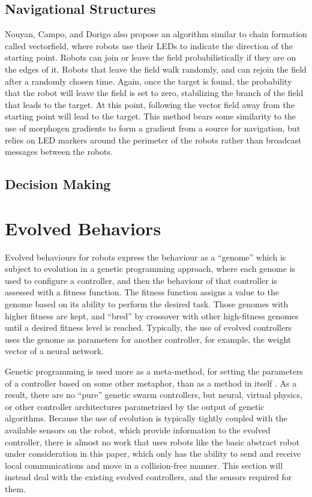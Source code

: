 \documentclass[]{article}
\begin{document}
\subsection{Navigational Structures}

Nouyan, Campo, and Dorigo also propose an algorithm similar to chain formation called vectorfield, where robots use their LEDs to indicate the direction of the starting point.
Robots can join or leave the field probabilistically if they are on the edges of it. 
Robots that leave the field walk randomly, and can rejoin the field after a randomly chosen time.
Again, once the target is found, the probability that the robot will leave the field is set to zero, stabilizing the branch of the field that leads to the target. 
At this point, following the vector field away from the starting point will lead to the target. 
This method bears some similarity to the use of morphogen gradients to form a gradient from a source for navigation, but relies on LED markers around the perimeter of the robots rather than broadcast messages between the robots. 

\subsection{Decision Making}

\section{Evolved Behaviors}

Evolved behaviours for robots express the behaviour as a ``genome'' which is subject to evolution in a genetic programming approach, where each genome is used to configure a controller, and then the behaviour of that controller is assessed with a fitness function. 
The fitness function assigns a value to the genome based on its ability to perform the desired task. 
Those genomes with higher fitness are kept, and ``bred'' by crossover with other high-fitness genomes until a desired fitness level is reached. 
Typically, the use of evolved controllers uses the genome as parameters for another controller, for example, the weight vector of a neural network. 

Genetic programming is used more as a meta-method, for setting the parameters of a controller based on some other metaphor, than as a method in itself \cite{fehervari2013evolution}. 
As a result, there are no ``pure'' genetic swarm controllers, but neural, virtual physics, or other controller architectures parametrized by the output of genetic algorithms. 
Because the use of evolution is typically tightly coupled with the available sensors on the robot, which provide information to the evolved controller, there is almost no work that uses robots like the basic abstract robot under consideration in this paper, which only has the ability to send and receive local communications and move in a collision-free manner. 
This section will instead deal with the existing evolved controllers, and the sensors required for them. 
\end{document}

